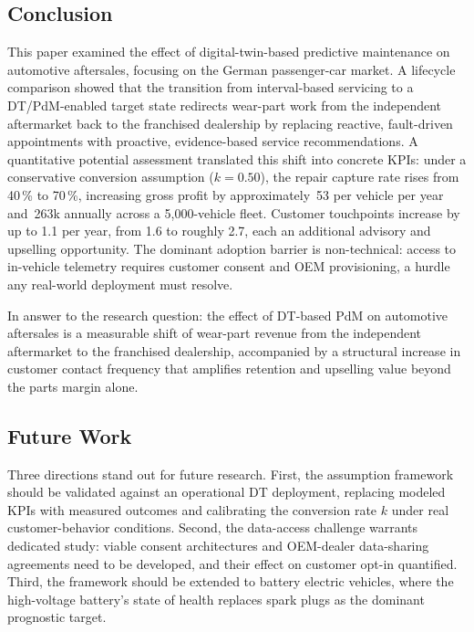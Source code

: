 \documentclass[conference,a4paper]{IEEEtran}
\newcommand{\eur}{\ifmmode\text{\texteuro}\else\texteuro\fi}
\begin{document}
\subsection{Conclusion}

This paper examined the effect of digital-twin-based predictive maintenance
on automotive aftersales, focusing on the German passenger-car market. A
lifecycle comparison showed that the transition from interval-based
servicing to a DT/PdM-enabled target state redirects wear-part work from the
independent aftermarket back to the franchised dealership by replacing
reactive, fault-driven appointments with proactive, evidence-based service
recommendations. A quantitative potential assessment translated this shift into concrete KPIs: under a
conservative conversion assumption ($k = 0.50$), the repair capture rate
rises from 40\,\% to 70\,\%, increasing gross profit by approximately
\eur\,53 per vehicle per year and \eur\,263k annually across a
5{,}000-vehicle fleet. Customer touchpoints increase by up to 1.1 per
year, from 1.6 to roughly 2.7, each an additional advisory and upselling opportunity. The dominant adoption barrier is non-technical: access to
in-vehicle telemetry requires customer consent and OEM provisioning, a
hurdle any real-world deployment must resolve. 

In answer to the research
question: the effect of DT-based PdM on automotive aftersales is a
measurable shift of wear-part revenue from the independent aftermarket to
the franchised dealership, accompanied by a structural increase in customer
contact frequency that amplifies retention and upselling value beyond the
parts margin alone.

\subsection{Future Work}\label{sec:future}
Three directions stand out for future research. First, the assumption
framework should be validated against an operational DT deployment,
replacing modeled KPIs with measured outcomes and calibrating the conversion
rate $k$ under real customer-behavior conditions. Second, the data-access
challenge warrants dedicated study: viable consent architectures and
OEM-dealer data-sharing agreements need to be developed, and their effect on
customer opt-in quantified. Third, the framework should be extended to battery electric vehicles, where
the high-voltage battery's state of health replaces spark plugs as the
dominant prognostic target.
\end{document}
